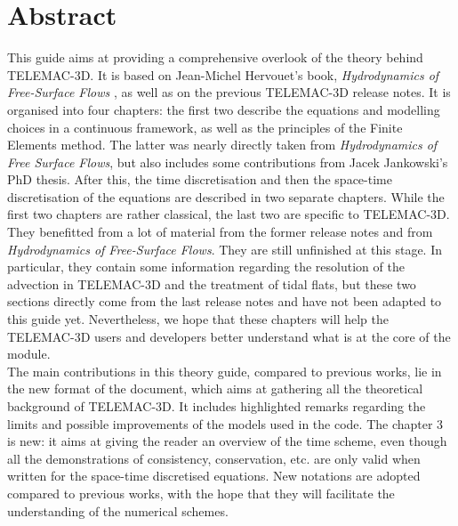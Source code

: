 \documentclass[Telemac3D]{../../data/TelemacDoc} %
\begin{document}
\chapter*{Abstract}\label{Abstract}
This guide aims at providing a comprehensive overlook of the theory behind TELEMAC-3D.
It is based on Jean-Michel Hervouet's book, \textit{Hydrodynamics of Free-Surface Flows} \cite{hervouet007}, as well as
on the previous TELEMAC-3D release notes. It is organised into four chapters: the first two describe the equations
and modelling choices in a continuous framework, as well as the principles of the Finite Elements method.
The latter was nearly directly taken from \textit{Hydrodynamics of Free Surface Flows}, but
also includes some contributions from Jacek Jankowski's PhD thesis.
After this, the time discretisation and then the space-time discretisation of the equations are described in two separate chapters.
While the first two chapters are rather classical, the last two are specific to TELEMAC-3D. They benefitted from a lot
of material from the former release notes and from \textit{Hydrodynamics of Free-Surface Flows}.
They are still unfinished at this stage. In particular, they contain some information regarding the resolution of the advection
in TELEMAC-3D and the treatment of tidal flats, but these two sections directly come from the last release notes
and have not been adapted to this guide yet. Nevertheless, we hope that these chapters will help the
TELEMAC-3D users and developers better understand what is at the core of the module.\\

The main contributions in this theory guide, compared to previous works, lie in the new format
of the document, which aims at gathering all the theoretical background of TELEMAC-3D.
It includes highlighted remarks regarding the limits and possible improvements of the models used in the code.
The chapter 3 is new: it aims at giving the reader an overview of the time scheme, even though all
the demonstrations of consistency, conservation, etc. are only valid when written for the space-time
discretised equations. New notations are adopted compared to previous works, with the hope that
they will facilitate the understanding of the numerical schemes.



\newpage
\end{document}
